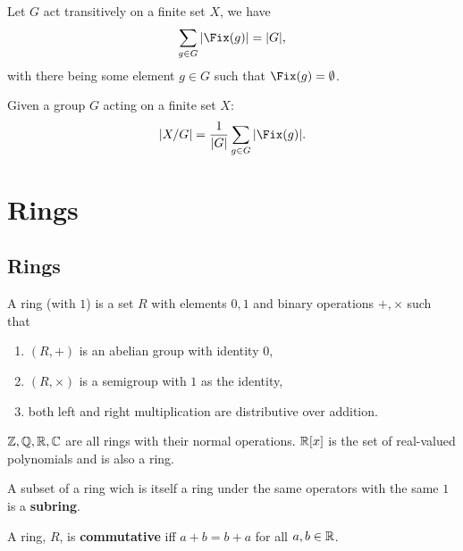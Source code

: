 \documentclass[../Year2.tex]{subfiles}
\begin{document}
\vspace{-20pt}

\begin{theorem}
    Let $G$ act transitively on a finite set $X$, we have \[
        \sum_{g\in G}|\Fix(g)| = |G|
    \black{,}
    \] with there being some element $g\in G$ such that $\Fix(g)=\emptyset$.
\end{theorem}

\begin{corollary}
    Given a group $G$ acting on a finite set $X$: \[
        |X/G| = \frac{1}{|G|}\sum_{g\in G}|\Fix(g)|
        \black{.}
    \]
\end{corollary}

\vspace{-30pt}

\section{Rings}

\subsection{Rings}

\begin{definition}[Ring]
    A ring (with $1$) is a set $R$ with elements $0,1$ and binary operations $+,\times$ such that \begin{enumerate}
        \item $(R,+)$ is an abelian group with identity $0$,
        \item $(R,\times)$ is a semigroup with $1$ as the identity,
        \item both left and right multiplication are distributive over addition.
    \end{enumerate}
\end{definition}

\begin{examples}
    $\mathbb{Z},\mathbb{Q},\mathbb{R},\mathbb{C}$ are all rings with their normal operations. $\mathbb{R}[x]$ is the set of real-valued polynomials and is also a ring.
\end{examples}

\begin{definition}[Subring]
    A subset of a ring wich is itself a ring under the same operators with the same $1$ is a \textbf{subring}.
\end{definition}

\begin{definition}
    A ring, $R$, is \textbf{commutative} iff $a+b=b+a$ for all $a,b\in\mathbb{R}$.
\end{definition}
\end{document}
